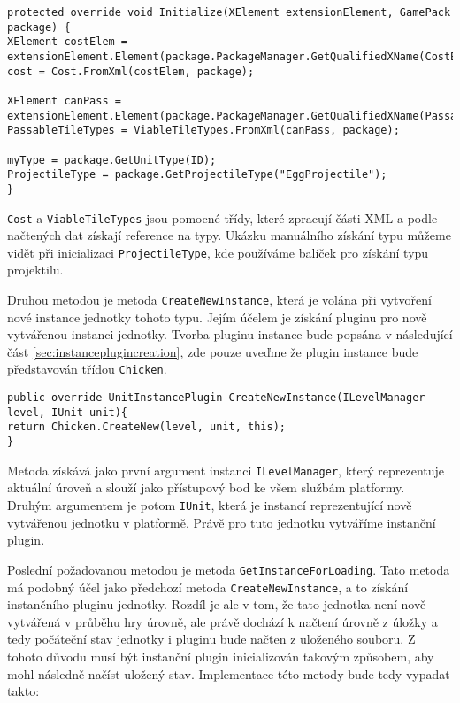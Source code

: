\begin{lstlisting}
protected override void Initialize(XElement extensionElement, GamePack package) {
XElement costElem = extensionElement.Element(package.PackageManager.GetQualifiedXName(CostElement));
cost = Cost.FromXml(costElem, package);

XElement canPass =
extensionElement.Element(package.PackageManager.GetQualifiedXName(PassableTileTypesElement));
PassableTileTypes = ViableTileTypes.FromXml(canPass, package);

myType = package.GetUnitType(ID);
ProjectileType = package.GetProjectileType("EggProjectile");
}
\end{lstlisting}

\texttt{Cost} a \texttt{ViableTileTypes} jsou pomocné třídy, které zpracují části XML a podle načtených dat získají reference na typy. Ukázku manuálního získání typu můžeme vidět při inicializaci \texttt{ProjectileType}, kde používáme balíček pro získání typu projektilu.


Druhou metodou je metoda \texttt{CreateNewInstance}, která je volána při vytvoření nové instance jednotky tohoto typu. Jejím účelem je získání pluginu pro nově vytvářenou instanci jednotky. Tvorba pluginu instance bude popsána v následující část \ref{sec:instanceplugincreation}, zde pouze uveďme že plugin instance bude představován třídou \texttt{Chicken}.
\begin{lstlisting}
public override UnitInstancePlugin CreateNewInstance(ILevelManager level, IUnit unit){
return Chicken.CreateNew(level, unit, this);
}
\end{lstlisting}
Metoda získává jako první argument instanci \texttt{ILevelManager}, který reprezentuje aktuální úroveň a slouží jako přístupový bod ke všem službám platformy. Druhým argumentem je potom \texttt{IUnit}, která je instancí reprezentující nově vytvářenou jednotku v platformě. Právě pro tuto jednotku vytváříme instanční plugin.


Poslední požadovanou metodou je metoda \texttt{GetInstanceForLoading}. Tato metoda má podobný účel jako předchozí metoda \texttt{CreateNewInstance}, a to získání instančního pluginu jednotky. Rozdíl je ale v tom, že tato jednotka není nově vytvářená v průběhu hry úrovně, ale právě dochází k načtení úrovně z úložky a tedy počáteční stav jednotky i pluginu bude načten z uloženého souboru. Z tohoto důvodu musí být instanční plugin inicializován takovým způsobem, aby mohl následně načíst uložený stav. Implementace této metody bude tedy vypadat takto:

